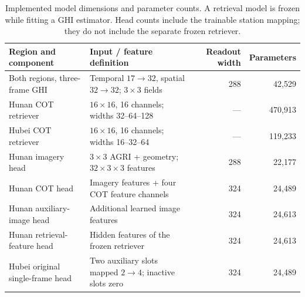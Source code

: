 \documentclass[11pt]{article}
\begin{document}
\begin{table}[!htbp]\centering\small
\caption{Implemented model dimensions and parameter counts. A retrieval model is frozen while fitting a GHI estimator. Head counts include the trainable station mapping; they do not include the separate frozen retriever.}\label{tab:model_sizes}
\begin{tabularx}{\linewidth}{p{29mm}Xrr}\toprule
Region and component & Input / feature definition & Readout width & Parameters\\\midrule
Both regions, three-frame GHI & Temporal $17\to32$, spatial $32\to32$; $3\times3$ fields & 288 & 42,529\\
Hunan COT retriever & $16\times16$, 16 channels; widths 32--64--128 & --- & 470,913\\
Hubei COT retriever & $16\times16$, 16 channels; widths 16--32--64 & --- & 119,233\\
Hunan imagery head & $3\times3$ AGRI + geometry; $32\times3\times3$ features & 288 & 22,177\\
Hunan COT head & Imagery features + four COT feature channels & 324 & 24,489\\
Hunan auxiliary-image head & Additional learned image features & 324 & 24,613\\
Hunan retrieval-feature head & Hidden features of the frozen retriever & 324 & 24,613\\
Hubei original single-frame head & Two auxiliary slots mapped $2\to4$; inactive slots zero & 324 & 24,489\\\bottomrule
\end{tabularx}
\end{table}
\end{document}
